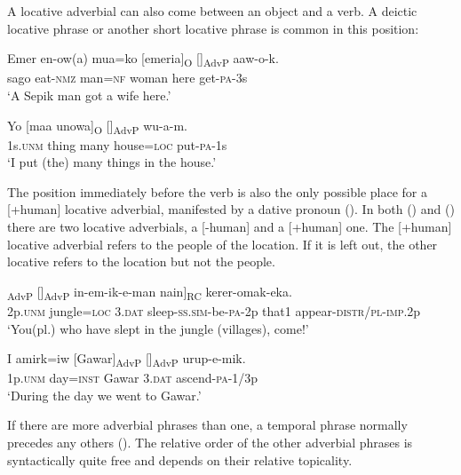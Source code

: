 A locative adverbial can also come between an object  and a verb. A deictic locative phrase or another short locative phrase is common in this position:

\ea%
\label{ex:x914}
\gll Emer  en-ow(a)  mua=ko  [emeria]\textsubscript{O}  []\textsubscript{AdvP}  aaw-o-k. \\
     sago  eat-\textsc{nmz}  man=\textsc{nf}  woman  here  get-\textsc{pa}-3s \\
\glt `A Sepik man got a wife here.'
\z

\ea%
\label{ex:x931}
\gll Yo  [maa  unowa]\textsubscript{O}  []\textsubscript{AdvP}  wu-a-m. \\
     1s.\textsc{unm}  thing  many  house=\textsc{loc}  put-\textsc{pa}-1s \\
\glt `I put (the) many things in the house.'
\z

The position immediately before the verb is also the only possible place for a [+human] locative adverbial, manifested by a dative pronoun (). In both () and () there are two locative adverbials, a [-human] and a [+human] one. The [+human] locative adverbial refers to the people of the location. If it is left out, the other locative refers to the location but not the people. 

\ea%
\label{ex:x854}
\gll [Ni  [koka-pa]\textsubscript{AdvP}  []\textsubscript{AdvP}  in-em-ik-e-man nain]\textsubscript{RC} kerer-omak-eka. \\
     2p.\textsc{unm}  jungle=\textsc{loc}  3.\textsc{dat}  sleep-\textsc{ss}.\textsc{sim}-be-\textsc{pa}-2p that1 appear-\textsc{distr}/\textsc{pl}-\textsc{imp}.2p \\
\glt `You(pl.) who have slept in the jungle (villages), come!' 
\z

\ea%
\label{ex:x855}
\gll I  amirk=iw  [Gawar]\textsubscript{AdvP}  []\textsubscript{AdvP}  urup-e-mik. \\
     1p.\textsc{unm}  day=\textsc{inst}  Gawar  3.\textsc{dat}  ascend-\textsc{pa}-1/3p \\
\glt `During the day we went to Gawar.'
\z

If there are more adverbial phrases than one, a temporal phrase normally precedes any others ().  The relative order of the other adverbial phrases is syntactically quite free and depends on their relative topicality.

